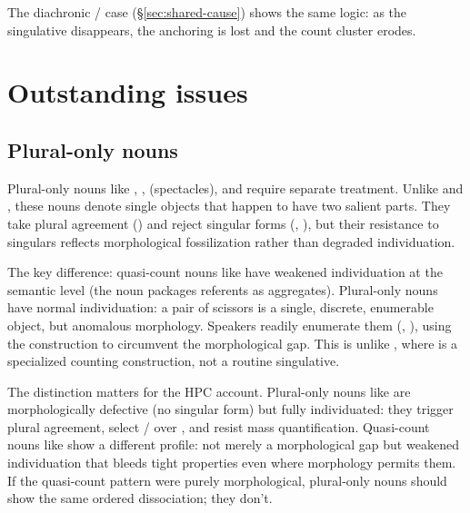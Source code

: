 \documentclass[12pt,a4paper]{article}
\begin{document}
The diachronic / case (\S\ref{sec:shared-cause}) shows the same logic: as the singulative disappears, the anchoring is lost and the count cluster erodes.

\section{Outstanding issues}\label{sec:outstanding}

\subsection{Plural-only nouns}

Plural-only nouns like , ,  (spectacles), and  require separate treatment. Unlike  and , these nouns denote single objects that happen to have two salient parts. They take plural agreement () and reject singular forms (, ), but their resistance to singulars reflects morphological fossilization rather than degraded individuation.

The key difference: quasi-count nouns like  have weakened individuation at the semantic level (the noun packages referents as aggregates). Plural-only nouns have normal individuation: a pair of scissors is a single, discrete, enumerable object, but anomalous morphology. Speakers readily enumerate them (, ), using the  construction to circumvent the morphological gap. This is unlike , where  is a specialized counting construction, not a routine singulative.

The distinction matters for the HPC account. Plural-only nouns like  are morphologically defective (no singular form) but fully individuated: they trigger plural agreement, select / over , and resist mass quantification. Quasi-count nouns like  show a different profile: not merely a morphological gap but weakened individuation that bleeds tight properties even where morphology permits them. If the quasi-count pattern were purely morphological, plural-only nouns should show the same ordered dissociation; they don't.
\end{document}
